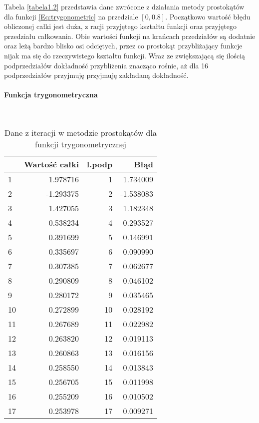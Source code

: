 \documentclass[12pt,twoside]{article}
\begin{document}
Tabela \eqref{tabela1.2} przedstawia dane zwrócone z działania metody prostokątów dla funkcji \eqref{Eq:trygonometric} na przedziale $[0,0.8]$.
Początkowo wartość błędu obliczonej całki jest duża, z racji przyjętego kształtu funkcji oraz przyjętego przedziału całkowania. Obie wartości funkcji na krańcach przedziałów są dodatnie oraz leżą bardzo blisko osi odciętych, przez co prostokąt przybliżający funkcje nijak ma się do rzeczywistego kształtu funkcji. Wraz ze zwiększającą się ilością podprzedziałów dokładność przybliżenia znacząco rośnie, aż dla 16 podprzedziałów przyjmuję przyjmuję zakładaną dokładność.


\paragraph{Funkcja trygonometryczna}\mbox{} \\
\begin{table}[H]
\centering 
\caption{Dane z iteracji w metodzie prostokątów dla funkcji trygonometrycznej}
\label{tabela1.2}
\begin{tabular}{lrrr}
\toprule
{} &  Wartość całki &  l.podp &      Błąd \\
\midrule
1  &       1.978716 &       1 &  1.734009 \\
2  &      -1.293375 &       2 & -1.538083 \\
3  &       1.427055 &       3 &  1.182348 \\
4  &       0.538234 &       4 &  0.293527 \\
5  &       0.391699 &       5 &  0.146991 \\
6  &       0.335697 &       6 &  0.090990 \\
7  &       0.307385 &       7 &  0.062677 \\
8  &       0.290809 &       8 &  0.046102 \\
9  &       0.280172 &       9 &  0.035465 \\
10  &       0.272899 &      10 &  0.028192 \\
11 &       0.267689 &      11 &  0.022982 \\
12 &       0.263820 &      12 &  0.019113 \\
13 &       0.260863 &      13 &  0.016156 \\
14 &       0.258550 &      14 &  0.013843 \\
15 &       0.256705 &      15 &  0.011998 \\
16 &       0.255209 &      16 &  0.010502 \\
17 &       0.253978 &      17 &  0.009271 \\
\bottomrule
\end{tabular}
\end{table}
\end{document}
